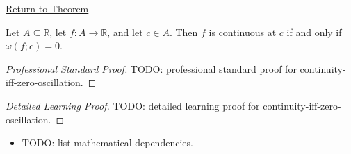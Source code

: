 \newpage
{}
\label{prf:continuity-iff-zero-oscillation}

\begin{remark*}[Return]
\hyperref[thm:continuity-iff-zero-oscillation]{Return to Theorem}
\end{remark*}

\begin{theorem*}
Let $A \subseteq \mathbb{R}$, let $f \colon A \to \mathbb{R}$, and let $c \in A$. Then $f$ is continuous at $c$ if and only if $\omega(f;c)=0$.
\end{theorem*}

\begin{proof}[Professional Standard Proof]
\LRAProofBodyStart
TODO: professional standard proof for continuity-iff-zero-oscillation.
\end{proof}

\begin{proof}[Detailed Learning Proof]
\LRAProofBodyStart
TODO: detailed learning proof for continuity-iff-zero-oscillation.
\end{proof}

\begin{remark*}
\end{remark*}

\begin{dependencies}
\begin{itemize}
  \item TODO: list mathematical dependencies.
\end{itemize}
\end{dependencies}

\clearpage
